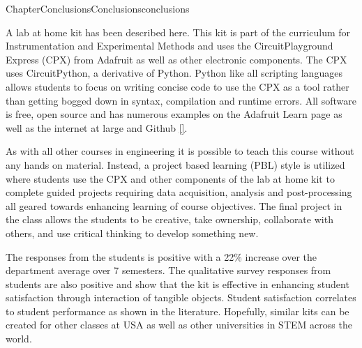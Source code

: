 \documentclass[oneside,10pt,]{book}
\newcommand{\xreffont}{\relax}
\newcommand{\linkhilite}[1]{\underline{#1}}
\numberwithin{equation}{section}
\begin{document}
\begin{chapterptx}{Chapter}{Conclusions}{}{Conclusions}{}{}{conclusions}
\renewcommand*{\chaptername}{Chapter}
\begin{introduction}{}%
A lab at home kit has been described here. This kit is part of the curriculum for Instrumentation and Experimental Methods and uses the CircuitPlayground Express (CPX) from Adafruit as well as other electronic components. The CPX uses CircuitPython, a derivative of Python. Python like all scripting languages allows students to focus on writing concise code to use the CPX as a tool rather than getting bogged down in syntax, compilation and runtime errors. All software is free, open source and has numerous examples on the Adafruit Learn page as well as the internet at large and Github \hyperlink{Github}{\linkhilite{[{\xreffont 33}]}}.%
\par
As with all other courses in engineering it is possible to teach this course without any hands on material. Instead, a project based learning (PBL) style is utilized where students use the CPX and other components of the lab at home kit to complete guided projects requiring data acquisition, analysis and post-processing all geared towards enhancing learning of course objectives. The final project in the class allows the students to be creative, take ownership, collaborate with others, and use critical thinking to develop something new.%
\par
The responses from the students is positive with a 22\% increase over the department average over 7 semesters. The qualitative survey responses from students are also positive and show that the kit is effective in enhancing student satisfaction through interaction of tangible objects. Student satisfaction correlates to student performance as shown in the literature. Hopefully, similar kits can be created for other classes at USA as well as other universities in STEM across the world.%
\end{introduction}%
\end{chapterptx}
%
%
\typeout{************************************************}
\typeout{************************************************}
%
\end{document}
